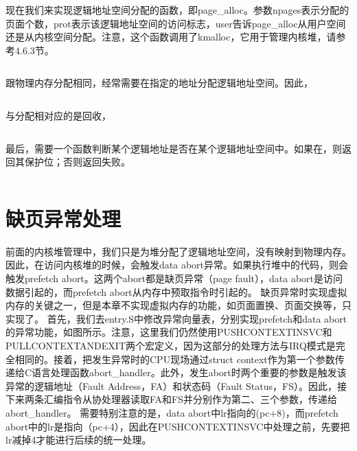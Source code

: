 \documentclass[main.tex]{subfiles}
\begin{document}
\begin{CJK*}{UTF8}{song}
\inputminted[firstline=38,lastline=47,linenos,numbersep=5pt,frame=lines,framesep=2mm]{c}{src/chapter04/kernel/page.c}

现在我们来实现逻辑地址空间分配的函数，即page\_alloc。参数npages表示分配的页面个数，prot表示该逻辑地址空间的访问标志，user告诉page\_alloc从用户空间还是从内核空间分配。注意，这个函数调用了kmalloc，它用于管理内核堆，请参考4.6.3节。

\inputminted[firstline=112,lastline=174,linenos,numbersep=5pt,frame=lines,framesep=2mm]{c}{src/chapter04/kernel/page.c}

跟物理内存分配相同，经常需要在指定的地址分配逻辑地址空间。因此，

\inputminted[firstline=49,lastline=110,linenos,numbersep=5pt,frame=lines,framesep=2mm]{c}{src/chapter04/kernel/page.c}

与分配相对应的是回收，

\inputminted[firstline=176,lastline=212,linenos,numbersep=5pt,frame=lines,framesep=2mm]{c}{src/chapter04/kernel/page.c}

最后，需要一个函数判断某个逻辑地址是否在某个逻辑地址空间中。如果在，则返回其保护位；否则返回失败。

\inputminted[firstline=214,lastline=237,linenos,numbersep=5pt,frame=lines,framesep=2mm]{c}{src/chapter04/kernel/page.c}

\section{缺页异常处理}
前面的内核堆管理中，我们只是为堆分配了逻辑地址空间，没有映射到物理内存。因此，在访问内核堆的时候，会触发data abort异常。如果执行堆中的代码，则会触发prefetch abort。这两个abort都是缺页异常（page fault），data abort是访问数据引起的，而prefetch abort从内存中预取指令时引起的。
缺页异常时实现虚拟内存的关键之一，但是本章不实现虚拟内存的功能，如页面置换、页面交换等，只实现了。
首先，我们去entry.S中修改异常向量表，分别实现prefetch和data abort的异常功能，如图所示。注意，这里我们仍然使用PUSHCONTEXTINSVC和PULLCONTEXTANDEXIT两个宏定义，因为这部分的处理方法与IRQ模式是完全相同的。接着，把发生异常时的CPU现场通过struct context作为第一个参数传递给C语言处理函数abort\_handler。此外，发生abort时两个重要的参数是触发该异常的逻辑地址（Fault Address，FA）和状态码（Fault Status，FS）。因此，接下来两条汇编指令从协处理器读取FA和FS并分别作为第二、三个参数，传递给abort\_handler。
需要特别注意的是，data abort中lr指向的(pc+8)，而prefetch abort中的lr是指向（pc+4），因此在PUSHCONTEXTINSVC中处理之前，先要把lr减掉4才能进行后续的统一处理。


\end{CJK*}
\end{document}
